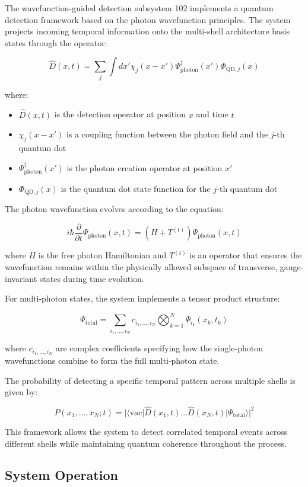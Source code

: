 \documentclass[12pt,letterpaper]{article}
\begin{document}
The wavefunction-guided detection subsystem 102 implements a quantum detection framework based on the photon wavefunction principles. The system projects incoming temporal information onto the multi-shell architecture basis states through the operator:

$$\hat{D}(x,t) = \sum_j \int dx' \chi_j(x-x')\Psi_{\text{photon}}^\dagger(x')\Phi_{\text{QD},j}(x)$$

where:
\begin{itemize}
    \item $\hat{D}(x,t)$ is the detection operator at position $x$ and time $t$
    \item $\chi_j(x-x')$ is a coupling function between the photon field and the $j$-th quantum dot
    \item $\Psi_{\text{photon}}^\dagger(x')$ is the photon creation operator at position $x'$
    \item $\Phi_{\text{QD},j}(x)$ is the quantum dot state function for the $j$-th quantum dot
\end{itemize}

The photon wavefunction evolves according to the equation:

$$i\hbar \frac{\partial}{\partial t}\Psi_{\text{photon}}(x,t) = (H + T^{(t)})\Psi_{\text{photon}}(x,t)$$

where $H$ is the free photon Hamiltonian and $T^{(t)}$ is an operator that ensures the wavefunction remains within the physically allowed subspace of transverse, gauge-invariant states during time evolution.

For multi-photon states, the system implements a tensor product structure:

$$\Psi_{\text{total}} = \sum_{i_1,...,i_N} c_{i_1,...,i_N}\bigotimes_{k=1}^N \Psi_{i_k}(x_k,t_k)$$

where $c_{i_1,...,i_N}$ are complex coefficients specifying how the single-photon wavefunctions combine to form the full multi-photon state.

The probability of detecting a specific temporal pattern across multiple shells is given by:

$$P(x_1,...,x_N;t) = |\langle \text{vac}|\hat{D}(x_1,t)...\hat{D}(x_N,t)|\Psi_{\text{total}}\rangle|^2$$

This framework allows the system to detect correlated temporal events across different shells while maintaining quantum coherence throughout the process.

\subsection{System Operation}
\end{document}
